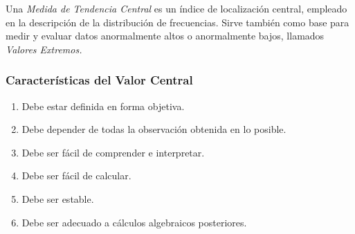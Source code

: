 Una \textit{Medida de Tendencia Central} es un índice de localización central, empleado en la descripción de la distribución de frecuencias. Sirve también como base para medir y evaluar datos anormalmente altos o anormalmente bajos, llamados \textit{Valores Extremos.}
\subsubsection{Características del Valor Central}
\begin{enumerate}
\item Debe estar definida en forma objetiva.
\item Debe depender de todas la observación obtenida en lo posible.
\item Debe ser fácil de comprender e interpretar.
\item Debe ser fácil de calcular.
\item Debe ser estable.
\item Debe ser adecuado a cálculos algebraicos posteriores.
\end{enumerate}